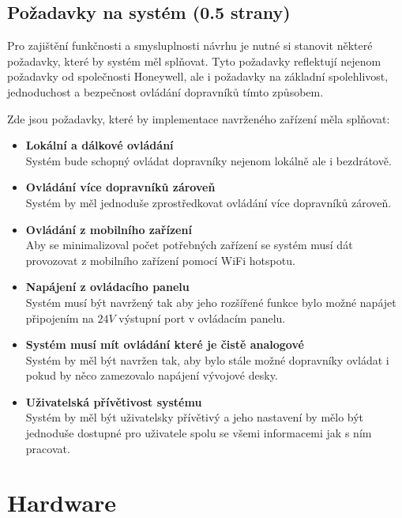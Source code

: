 \subsection{Požadavky na systém (0.5 strany)}\label{sec:PozadavkyNaSystem}
Pro zajištění funkčnosti a smysluplnosti návrhu je nutné si stanovit některé požadavky, které by systém měl splňovat. Tyto požadavky reflektují nejenom požadavky od společnosti Honeywell, ale i požadavky na základní spolehlivost, jednoduchost a bezpečnost ovládání dopravníků tímto způsobem.

Zde jsou požadavky, které by implementace navrženého zařízení měla splňovat:

\begin{itemize}
    \item \textbf{Lokální a dálkové ovládání}\\
    Systém bude schopný ovládat dopravníky nejenom lokálně ale i bezdrátově.
    \item \textbf{Ovládání více dopravníků zároveň}\\
    Systém by měl jednoduše zprostředkovat ovládání více dopravníků zároveň.
    \item \textbf{Ovládání z mobilního zařízení}\\
    Aby se minimalizoval počet potřebných zařízení se systém musí dát provozovat z mobilního zařízení pomocí WiFi hotspotu.
    \item \textbf{Napájení z ovládacího panelu}\\
    Systém musí být navržený tak aby jeho rozšířené funkce bylo možné napájet připojením na $24V$ výstupní port v ovládacím panelu.
    \item \textbf{Systém musí mít ovládání které je čistě analogové}\\
    Systém by měl být navržen tak, aby bylo stále možné dopravníky ovládat i pokud by něco zamezovalo napájení vývojové desky.
    \item \textbf{Uživatelská přívětivost systému}\\
    Systém by měl být uživatelsky přívětivý a jeho nastavení by mělo být jednoduše dostupné pro uživatele spolu se všemi informacemi jak s ním pracovat.
\end{itemize}

\section{Hardware}\label{sec:Hardware}

